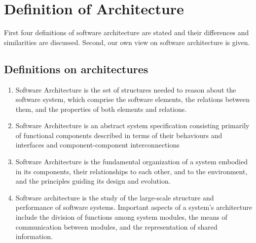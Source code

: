 \documentclass{article}
\begin{document}
\section{Definition of Architecture}

First four definitions of software architecture are stated and their differences
and similarities are discussed. Second, our own view on software architecture is
given.
\subsection{Definitions on architectures}

\begin{enumerate}
\item Software Architecture is the set of structures needed to reason about the software system, which comprise the software elements, the relations between them, and the properties of both elements and relations.\cite{clemens}

\item Software Architecture is an abstract system specification consisting primarily of functional components described in terms of their behaviours and interfaces and component-component interconnections\cite{hayesroth}

\item Software Architecture is the fundamental organization of a system embodied in its components, their relationships to each other, and to the environment, and the principles guiding its design and evolution.\cite{IEEE1471}

\item Software architecture is the study of the large-scale structure and performance of software systems. Important aspects of a system's architecture include the division of functions among system modules, the means of communication between modules, and the representation of shared information.\cite{lane90}

\end{enumerate}
\end{document}
